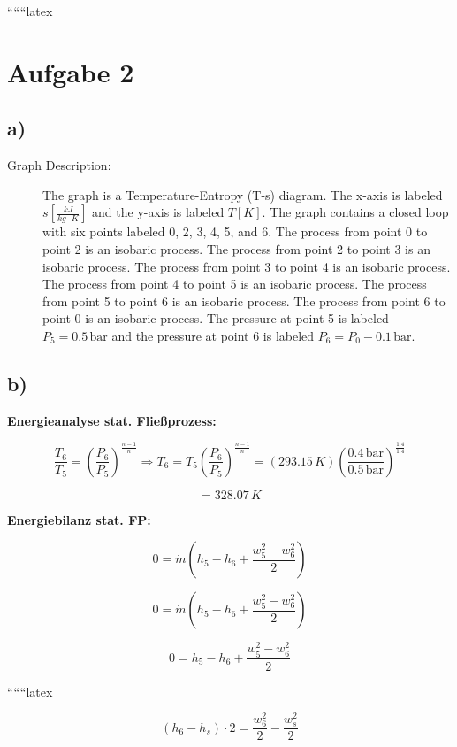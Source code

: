 
``````latex


\section*{Aufgabe 2}

\subsection*{a)}

\begin{description}
    \item[Graph Description:] The graph is a Temperature-Entropy (T-s) diagram. The x-axis is labeled $s \left[ \frac{kJ}{kg \cdot K} \right]$ and the y-axis is labeled $T \left[ K \right]$. The graph contains a closed loop with six points labeled 0, 2, 3, 4, 5, and 6. The process from point 0 to point 2 is an isobaric process. The process from point 2 to point 3 is an isobaric process. The process from point 3 to point 4 is an isobaric process. The process from point 4 to point 5 is an isobaric process. The process from point 5 to point 6 is an isobaric process. The process from point 6 to point 0 is an isobaric process. The pressure at point 5 is labeled $P_5 = 0.5 \, \text{bar}$ and the pressure at point 6 is labeled $P_6 = P_0 - 0.1 \, \text{bar}$.
\end{description}

\subsection*{b)}

\textbf{Energieanalyse stat. Fließprozess:}

\[
\frac{T_6}{T_5} = \left( \frac{P_6}{P_5} \right)^{\frac{n-1}{n}} \Rightarrow T_6 = T_5 \left( \frac{P_6}{P_5} \right)^{\frac{n-1}{n}} = (293.15 \, K) \left( \frac{0.4 \, \text{bar}}{0.5 \, \text{bar}} \right)^{\frac{1.4}{1.4}}
\]

\[
= 328.07 \, K
\]

\textbf{Energiebilanz stat. FP:}

\[
0 = \dot{m} \left( h_5 - h_6 + \frac{w_5^2 - w_6^2}{2} \right)
\]

\[
0 = \dot{m} \left( h_5 - h_6 + \frac{w_5^2 - w_6^2}{2} \right)
\]

\[
0 = h_5 - h_6 + \frac{w_5^2 - w_6^2}{2}
\]

``````latex


\begin{equation*}
(h_6 - h_s) \cdot 2 = \frac{w_6^2}{2} - \frac{w_s^2}{2}
\end{equation*}

